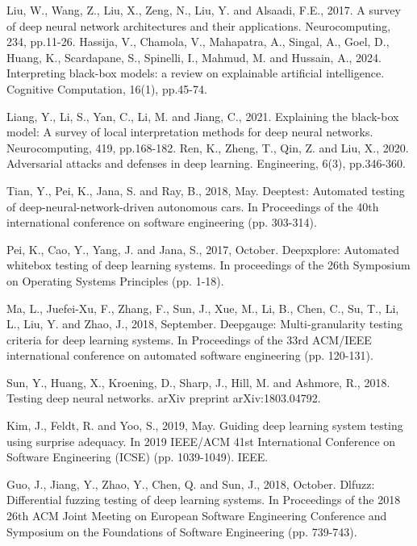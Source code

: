 \documentclass[10pt, conference, a4paper, final]{IEEEtran}
\begin{document}
\begin{thebibliography}{01}

    Liu, W., Wang, Z., Liu, X., Zeng, N., Liu, Y. and Alsaadi, F.E., 2017. A survey of deep neural network architectures and their applications. Neurocomputing, 234, pp.11-26.
    Hassija, V., Chamola, V., Mahapatra, A., Singal, A., Goel, D., Huang, K., Scardapane, S., Spinelli, I., Mahmud, M. and Hussain, A., 2024. Interpreting black-box models: a review on explainable artificial intelligence. Cognitive Computation, 16(1), pp.45-74.

     Liang, Y., Li, S., Yan, C., Li, M. and Jiang, C., 2021. Explaining the black-box model: A survey of local interpretation methods for deep neural networks. Neurocomputing, 419, pp.168-182.
    Ren, K., Zheng, T., Qin, Z. and Liu, X., 2020. Adversarial attacks and defenses in deep learning. Engineering, 6(3), pp.346-360.

    Tian, Y., Pei, K., Jana, S. and Ray, B., 2018, May. Deeptest: Automated testing of deep-neural-network-driven autonomous cars. In Proceedings of the 40th international conference on software engineering (pp. 303-314).
    
     Pei, K., Cao, Y., Yang, J. and Jana, S., 2017, October. Deepxplore: Automated whitebox testing of deep learning systems. In proceedings of the 26th Symposium on Operating Systems Principles (pp. 1-18).

    Ma, L., Juefei-Xu, F., Zhang, F., Sun, J., Xue, M., Li, B., Chen, C., Su, T., Li, L., Liu, Y. and Zhao, J., 2018, September. Deepgauge: Multi-granularity testing criteria for deep learning systems. In Proceedings of the 33rd ACM/IEEE international conference on automated software engineering (pp. 120-131).
    
    Sun, Y., Huang, X., Kroening, D., Sharp, J., Hill, M. and Ashmore, R., 2018. Testing deep neural networks. arXiv preprint arXiv:1803.04792.

    Kim, J., Feldt, R. and Yoo, S., 2019, May. Guiding deep learning system testing using surprise adequacy. In 2019 IEEE/ACM 41st International Conference on Software Engineering (ICSE) (pp. 1039-1049). IEEE.
  
   
    Guo, J., Jiang, Y., Zhao, Y., Chen, Q. and Sun, J., 2018, October. Dlfuzz: Differential fuzzing testing of deep learning systems. In Proceedings of the 2018 26th ACM Joint Meeting on European Software Engineering Conference and Symposium on the Foundations of Software Engineering (pp. 739-743).


\end{thebibliography}
\end{document}
